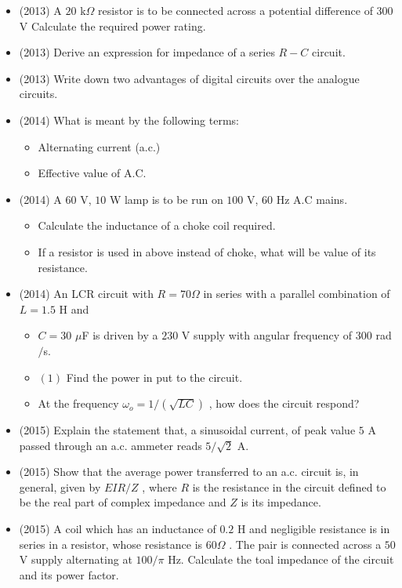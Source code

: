 \documentclass{article}
\begin{document}
\begin{itemize}
\item (2013)  A $ 20$ k$ \Omega$ resistor is to be connected across a potential difference of $ 300$ V Calculate the required power rating.
\item (2013)  Derive an expression for impedance of a series $ R-C$ circuit. 
\item (2013)  Write down two advantages of digital circuits over the analogue circuits.
\item (2014)  What is meant by the following terms:
 \begin{itemize}
\item Alternating current (a.c.)
\item Effective value of A.C. 
\end{itemize}
\item (2014)  A $ 60$ V, $ 10$ W lamp is to be run on $ 100$ V, $ 60$ Hz A.C mains.
 \begin{itemize}
\item Calculate the inductance of a choke coil required.
\item If a resistor is used in above instead of choke, what will be value of its resistance.
\end{itemize}
\item (2014)  An LCR circuit with $ R=70\Omega$ in series with a parallel combination of $ L=1.5$ H and
 \begin{itemize}
\item $ C=30$ $\mu$F is driven by a $ 230$ V supply with angular frequency of $ 300$ rad$/$s.
\item $ (1)$ Find the power in put to the circuit. 
\item  At the frequency $ \omega_{o}=1/(\sqrt{LC})$ , how does the circuit respond?
\end{itemize}
\item (2015)  Explain the statement that, a sinusoidal current, of peak value $ 5$ A passed through an a.c. ammeter reads $ 5/\sqrt{2}$ A.  
\item (2015)  Show that the average power transferred to an a.c. circuit is, in general, given by $ EIR/Z$ , where $ R$ is the resistance in the circuit defined to be the real part of complex impedance and $ Z$ is its impedance.
\item (2015)  A coil which has an inductance of $ 0.2$ H and negligible resistance is in series in a resistor, whose resistance is $ 60\Omega $ . The pair is connected across a $ 50$ V supply alternating at $ 100/\pi$ Hz.  Calculate the toal impedance of the circuit and its power factor.

\end{itemize}
\end{document}
